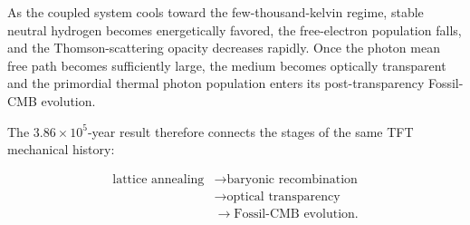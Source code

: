 As the coupled system cools toward the few-thousand-kelvin regime, stable neutral hydrogen becomes energetically favored, the free-electron population falls, and the Thomson-scattering opacity decreases rapidly. Once the photon mean free path becomes sufficiently large, the medium becomes optically transparent and the primordial thermal photon population enters its post-transparency Fossil-CMB evolution.

The \(3.86 \times 10^5\)-year result therefore connects the stages of the same TFT mechanical history:

\begin{equation}
\begin{aligned}
    \text{lattice annealing}
    &\longrightarrow
    \text{baryonic recombination}
    \\
    &\longrightarrow
    \text{optical transparency}
    \\
    &\longrightarrow
    \text{Fossil-CMB evolution}.
\end{aligned}
\end{equation}
